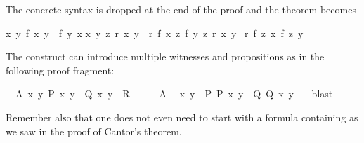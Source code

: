 \begin{isabellebody}
\endisatagproof
{\isafoldproof}%
%
\isadelimproof
%
\endisadelimproof
\isamarkuptrue%
%
\begin{isamarkuptext}%
\noindent The concrete syntax is dropped at the end of the proof and the
theorem becomes \begin{isabelle}%
{\isasymlbrakk}{\isasymAnd}x\ y{\isachardot}\ {\isacharquery}f\ x\ y\ {\isacharequal}\ {\isacharquery}f\ y\ x{\isacharsemicolon}\isanewline
\isaindent{\ }{\isasymAnd}x\ y\ z{\isachardot}\ {\isacharquery}r\ x\ y\ {\isasymLongrightarrow}\ {\isacharquery}r\ {\isacharparenleft}{\isacharquery}f\ x\ z{\isacharparenright}\ {\isacharparenleft}{\isacharquery}f\ y\ z{\isacharparenright}{\isacharsemicolon}\ {\isacharquery}r\ {\isacharquery}x\ {\isacharquery}y{\isasymrbrakk}\isanewline
{\isasymLongrightarrow}\ {\isacharquery}r\ {\isacharparenleft}{\isacharquery}f\ {\isacharquery}z\ {\isacharquery}x{\isacharparenright}\ {\isacharparenleft}{\isacharquery}f\ {\isacharquery}z\ {\isacharquery}y{\isacharparenright}%
\end{isabelle}
\tweakskip%
\end{isamarkuptext}%
\isamarkuptrue%
%
\isamarkuptrue%
%
\begin{isamarkuptext}%
The  construct can introduce multiple
witnesses and propositions as in the following proof fragment:%
\end{isamarkuptext}%
\isamarkupfalse%
\ \ A{\isacharcolon}\ {\isachardoublequote}{\isasymexists}x\ y{\isachardot}\ P\ x\ y\ {\isasymand}\ Q\ x\ y{\isachardoublequote}\ \ {\isachardoublequote}R{\isachardoublequote}\isanewline
%
\isadelimproof
%
\endisadelimproof
%
\isatagproof
\isamarkupfalse%
\ {\isacharminus}\isanewline
\ \ \isamarkupfalse%
\ A\ \isamarkupfalse%
\ x\ y\ \ P{\isacharcolon}\ {\isachardoublequote}P\ x\ y{\isachardoublequote}\ \ Q{\isacharcolon}\ {\isachardoublequote}Q\ x\ y{\isachardoublequote}\ \ \isamarkupfalse%
\ blast%
\endisatagproof
{\isafoldproof}%
%
\isadelimproof
%
\endisadelimproof
\isamarkuptrue%
%
\begin{isamarkuptext}%
Remember also that one does not even need to start with a formula
containing \isa{{\isasymexists}} as we saw in the proof of Cantor's theorem.%
\end{isamarkuptext}%
\isamarkuptrue%
%
\isamarkuptrue%
%
\begin{isamarkuptext}%

\end{isamarkuptext}
\end{isabellebody}
